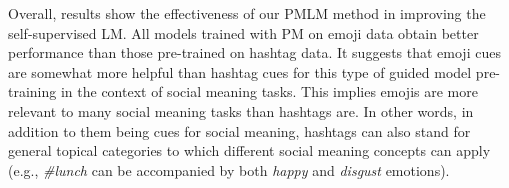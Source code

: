 Overall, results show the effectiveness of our PMLM method in improving the self-supervised LM. All models trained with PM on emoji data obtain better performance than those pre-trained on hashtag data. It suggests that emoji cues are somewhat more helpful than hashtag cues for this type of guided model pre-training in the context of social meaning tasks. This implies emojis are more relevant to many social meaning tasks than hashtags are. In other words, in addition to them being cues for social meaning, hashtags can also stand for general topical categories to which different social meaning concepts can apply (e.g., \textit{\#lunch} can be accompanied by both \textit{happy} and \textit{disgust} emotions).
